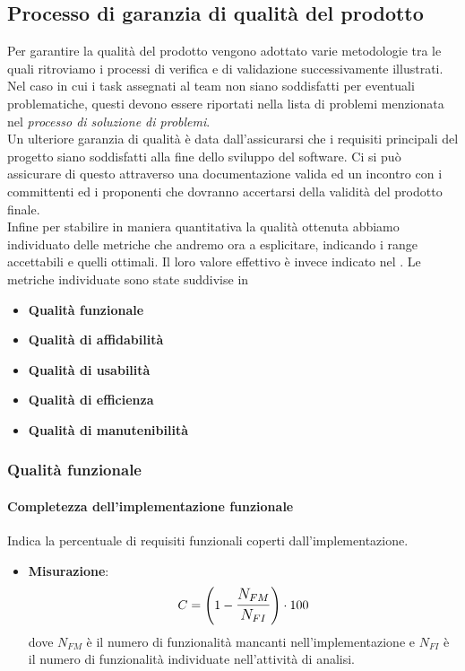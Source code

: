 \subsection{Processo di garanzia di qualità del prodotto}
Per garantire la qualità del prodotto vengono adottato varie metodologie tra le quali ritroviamo i processi di verifica e di validazione successivamente illustrati. \\
Nel caso in cui i task assegnati al team non siano soddisfatti per eventuali problematiche, questi devono essere riportati nella lista di problemi menzionata nel \textit{processo di soluzione di problemi}. \\
Un ulteriore garanzia di qualità è data dall'assicurarsi che i requisiti principali del progetto siano soddisfatti alla fine dello sviluppo del software. Ci si può assicurare di questo attraverso una documentazione valida ed un incontro con i committenti ed i proponenti che dovranno accertarsi della validità del prodotto finale. \\
Infine per stabilire in maniera quantitativa la qualità ottenuta abbiamo individuato delle metriche che andremo ora a esplicitare, indicando i range accettabili e quelli ottimali. Il loro valore effettivo è invece indicato nel \pianodiqualifica.
Le metriche individuate sono state suddivise in
\begin{itemize}
	\item\textbf{Qualità funzionale}
	\item\textbf{Qualità di affidabilità}
	\item\textbf{Qualità di usabilità}
	\item\textbf{Qualità di efficienza}
	\item\textbf{Qualità di manutenibilità}
\end{itemize}

\subsubsection{Qualità funzionale}

\paragraph{Completezza dell'implementazione funzionale}
Indica la percentuale di requisiti funzionali coperti dall'implementazione.
\begin{itemize}
	\item \textbf{Misurazione}: 
	$$C=\left(1-\mathlarger{\frac{N_{FM}}{N_{FI}}}\right) \cdot 100$$ 
	dove $N_{FM}$ è il numero di funzionalità mancanti nell'implementazione e $N_{FI}$ è il numero di funzionalità individuate nell'attività di analisi.
\end{itemize}

